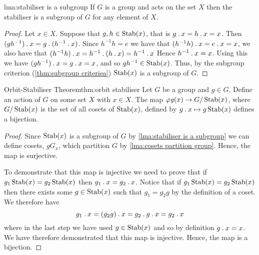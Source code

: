 \begin{lma}{}{lma:stabiliser is a subgroup}
    If \(G\) is a group and acts on the set \(X\) then the stabiliser is a subgroup of \(G\) for any element of \(X\).
    
    \begin{proof}
        Let \(x \in X\).
        Suppose that \(g, h \in \operatorname{Stab}(x)\), that is \(g\mathbin{.} x = h\mathbin{.} x = x\).
        Then \((gh^{-1})\mathbin{.} x = g\mathbin{.} (h^{-1} \mathbin{.} x)\).
        Since \(h^{-1}h = e\) we have that \((h^{-1}h)\mathbin{.} x = e\mathbin{.} x = x\), we also have that \((h^{-1}h)\mathbin{.} x = h^{-1}\mathbin{.} (h\mathbin{.} x) = h^{-1}\mathbin{.} x\) Hence \(h^{-1}\mathbin{.} x = x\).
        Using this we have \((gh^{-1}) \mathbin{.} x = g \mathbin{.} x = x\), and so \(gh^{-1} \in \operatorname{Stab}(x)\).
        Thus, by the subgroup criterion (\cref{thm:subgroup criteriea}) \(\operatorname{Stab}(x)\) is a subgroup of \(G\).
    \end{proof}
\end{lma}

\begin{thm}{Orbit-Stabiliser Theorem}{thm:orbit stabiliser}
    Let \(G\) be a group and \(g \in G\).
    Define an action of \(G\) on some set \(X\) with \(x \in X\).
    The map \(\varphi \mathit{g}(x) \to G/\operatorname{Stab}(x)\), where \(G/\operatorname{Stab}(x)\) is the set of all cosets of \(\operatorname{Stab}(x)\), defined by \(g\mathbin{.} x \mapsto g\operatorname{Stab}(x)\) defines a bijection.
    
    \begin{proof}
        Since \(\operatorname{Stab}(x)\) is a subgroup of \(G\) by \cref{lma:stabiliser is a subgroup} we can define cosets, \(gG_x\), which partition \(G\) by \cref{lma:cosets partition group}.
        Hence, the map is surjective.
        
        To demonstrate that this map is injective we need to prove that if \(g_1\operatorname{Stab}(x) = g_2\operatorname{Stab}(x)\) then \(g_1\mathbin{.} x = g_2 \mathbin{.} x\).
        Notice that if \(g_1\operatorname{Stab}(x) = g_2\operatorname{Stab}(x)\) then there exists some \(g \in \operatorname{Stab}(x)\) such that \(g_1 = g_2g\) by the definition of a coset.
        We therefore have
        \begin{equation}
            g_1\mathbin{.} x = (g_2g)\mathbin{.} x = g_2\mathbin{.} g\mathbin{.} x = g_2 \mathbin{.} x
        \end{equation}
        where in the last step we have used \(g \in \operatorname{Stab}(x)\) and so by definition \(g\mathbin{.} x = x\).
        We have therefore demonstrated that this map is injective.
        Hence, the map is a bijection.
    \end{proof}
\end{thm}

